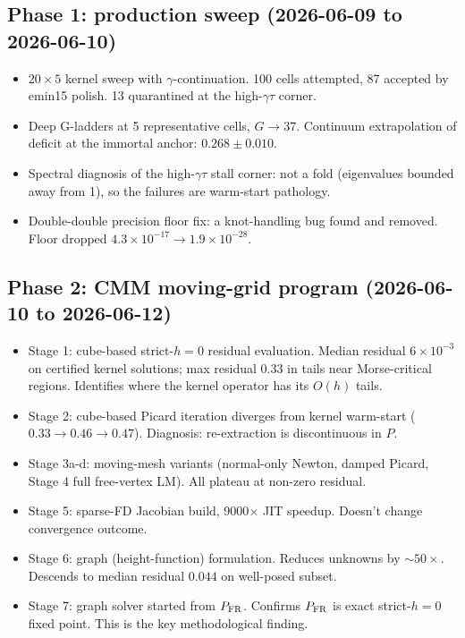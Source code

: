 \documentclass[11pt]{article}
\newcommand{\1}{\mathbf{1}}
\newcommand{\PFR}{P_{\rm FR}}
\begin{document}
\subsection{Phase 1: production sweep (2026-06-09 to 2026-06-10)}

\begin{itemize}
\item $20 \times 5$ kernel sweep with $\gamma$-continuation. 100 cells attempted, 87
accepted by emin15 polish. 13 quarantined at the high-$\gamma\tau$ corner.
\item Deep G-ladders at 5 representative cells, $G \to 37$. Continuum
extrapolation of deficit at the immortal anchor: $0.268 \pm 0.010$.
\item Spectral diagnosis of the high-$\gamma\tau$ stall corner: not a fold
(eigenvalues bounded away from 1), so the failures are warm-start pathology.
\item Double-double precision floor fix: a knot-handling bug found and
removed. Floor dropped $4.3 \times 10^{-17} \to 1.9 \times 10^{-28}$.
\end{itemize}

\subsection{Phase 2: CMM moving-grid program (2026-06-10 to 2026-06-12)}

\begin{itemize}
\item Stage 1: cube-based strict-$h=0$ residual evaluation. Median residual
$6 \times 10^{-3}$ on certified kernel solutions; max residual $0.33$ in
tails near Morse-critical regions. Identifies where the kernel operator has
its $O(h)$ tails.
\item Stage 2: cube-based Picard iteration diverges from kernel warm-start
($0.33 \to 0.46 \to 0.47$). Diagnosis: re-extraction is discontinuous in $P$.
\item Stage 3a-d: moving-mesh variants (normal-only Newton, damped Picard,
Stage 4 full free-vertex LM). All plateau at non-zero residual.
\item Stage 5: sparse-FD Jacobian build, 9000$\times$ JIT speedup. Doesn't
change convergence outcome.
\item Stage 6: graph (height-function) formulation. Reduces unknowns by
$\sim 50\times$. Descends to median residual $0.044$ on well-posed subset.
\item Stage 7: graph solver started from $\PFR$. Confirms $\PFR$ is exact
strict-$h=0$ fixed point. This is the key methodological finding.
\end{itemize}
\end{document}
